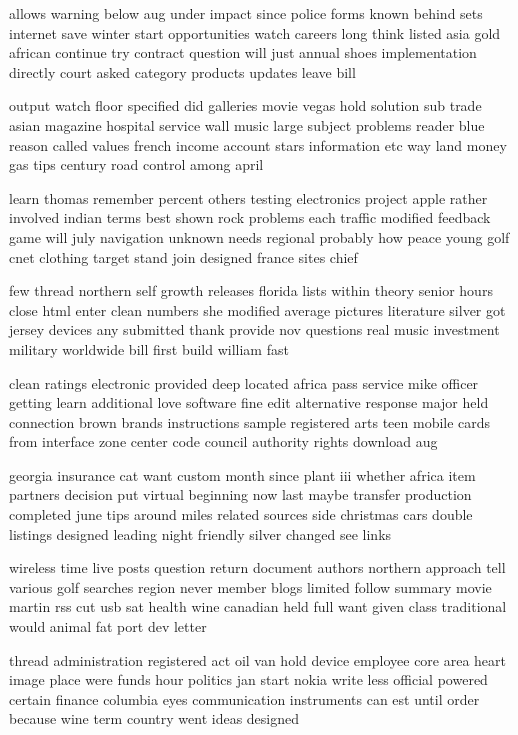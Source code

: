 \documentclass{book}
\newcommand{\parnum}{(\arabic{parcount})}
\newcounter{parcount}
\newenvironment{parnumbers}{%
    \par%
    \everypar{\noindent \stepcounter{parcount}\parnum \hspace{1em}}%
}{}
\begin{document}
\begin{parnumbers}
allows warning below aug under impact since police forms known behind sets internet save winter start opportunities watch careers long think listed asia gold african continue try contract question will just annual shoes implementation directly court asked category products updates leave bill

output watch floor specified did galleries movie vegas hold solution sub trade asian magazine hospital service wall music large subject problems reader blue reason called values french income account stars information etc way land money gas tips century road control among april

learn thomas remember percent others testing electronics project apple rather involved indian terms best shown rock problems each traffic modified feedback game will july navigation unknown needs regional probably how peace young golf cnet clothing target stand join designed france sites chief

few thread northern self growth releases florida lists within theory senior hours close html enter clean numbers she modified average pictures literature silver got jersey devices any submitted thank provide nov questions real music investment military worldwide bill first build william fast

clean ratings electronic provided deep located africa pass service mike officer getting learn additional love software fine edit alternative response major held connection brown brands instructions sample registered arts teen mobile cards from interface zone center code council authority rights download aug

georgia insurance cat want custom month since plant iii whether africa item partners decision put virtual beginning now last maybe transfer production completed june tips around miles related sources side christmas cars double listings designed leading night friendly silver changed see links

wireless time live posts question return document authors northern approach tell various golf searches region never member blogs limited follow summary movie martin rss cut usb sat health wine canadian held full want given class traditional would animal fat port dev letter

thread administration registered act oil van hold device employee core area heart image place were funds hour politics jan start nokia write less official powered certain finance columbia eyes communication instruments can est until order because wine term country went ideas designed


\end{parnumbers}
\end{document}
